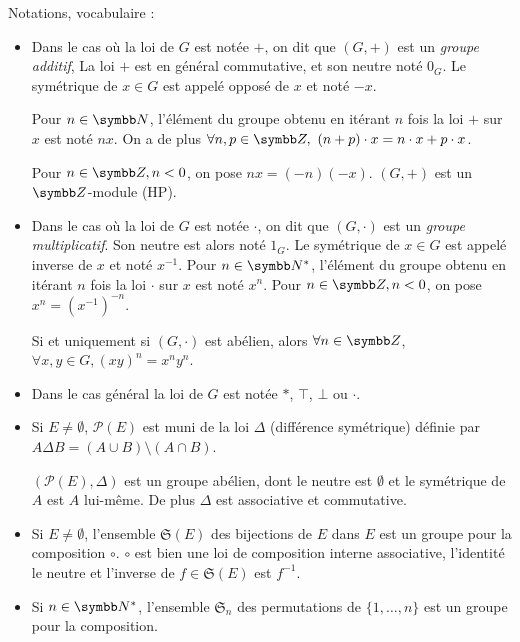 \begin{remarque}
Notations, vocabulaire :
\begin{itemize}
    \item Dans le cas où la loi de $G$ est notée $+$, on dit que $(G, +)$ est un \emph{groupe additif},
    La loi $+$ est en général commutative, et son neutre noté $0_G$. Le symétrique de $x \in G$ 
    est appelé opposé de $x$ et noté $-x$.

    Pour $n \in \N$, l'élément du groupe obtenu en itérant $n$ fois la loi $+$ sur $x$ est noté
    $nx$. On a de plus $\forall n,p \in \Z,~(n+p) \cdot x = n\cdot x + p\cdot x$.

    Pour $n \in \Z, n < 0$, on pose $nx = (-n)(-x)$. $(G, +)$ est un $\Z$-module (HP).

    \item Dans le cas où la loi de $G$ est notée $\cdot$, on dit que $(G, \cdot)$ est un \emph{groupe multiplicatif}.
    Son neutre est alors noté $1_G$. Le symétrique de $x \in G$ est appelé inverse de $x$ et noté $x^{-1}$.
    Pour $n \in \N^*$, l'élément du groupe obtenu en itérant $n$ fois la loi $\cdot$ sur $x$ est noté $x^n$. 
    Pour $n \in \Z, n < 0$, on pose $x^n = (x^{-1})^{-n}$.
    
    Si et uniquement si $(G, \cdot)$ est abélien, alors $\forall n \in \Z$, $\forall x, y \in G, (xy)^n = x^n y^n$.
    \item Dans le cas général la loi de $G$ est notée $\ast$, $\top$, $\bot$ ou $\cdot$. 

    \item Si $E \neq \emptyset$, $\mathscr P(E)$ est muni de la loi $\Delta$ (différence 
    symétrique) définie par $A \Delta B = (A \cup B) \setminus (A \cap B)$. 
    
    $(\mathscr P(E), \Delta)$ est un groupe abélien, dont le neutre est $\emptyset$ et
    le symétrique de $A$ est $A$ lui-même. De plus $\Delta$ est associative et commutative.

    \item Si $E \neq \emptyset$, l'ensemble $\mathfrak{S}(E)$ des bijections de $E$ dans $E$ est un groupe pour la composition $\circ$. 
    $\circ$ est bien une loi de composition interne associative, l'identité le neutre et l'inverse de $f \in \mathfrak{S}(E)$ est $f^{-1}$.

    \item Si $n \in \N^*$, l'ensemble $\mathfrak{S}_n$ des permutations de $\{1, \ldots, n\}$ est un groupe pour la composition.
\end{itemize}
\end{remarque}

